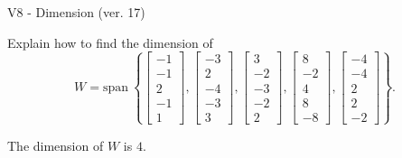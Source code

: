 \begin{exercise}
  \begin{exerciseTitle}V8 - Dimension (ver. 17)\end{exerciseTitle}
  \begin{exerciseStatement}
    Explain how to find the dimension of 
\[W=\mathrm{span}\ \left\{\left[\begin{array}{r}
-1 \\
-1 \\
2 \\
-1 \\
1
\end{array}\right] , \left[\begin{array}{r}
-3 \\
2 \\
-4 \\
-3 \\
3
\end{array}\right] , \left[\begin{array}{r}
3 \\
-2 \\
-3 \\
-2 \\
2
\end{array}\right] , \left[\begin{array}{r}
8 \\
-2 \\
4 \\
8 \\
-8
\end{array}\right] , \left[\begin{array}{r}
-4 \\
-4 \\
2 \\
2 \\
-2
\end{array}\right]\right\}.\]



  \end{exerciseStatement}
  \begin{exerciseAnswer}
   The dimension of \(W\) is  \(4\).
  


  \end{exerciseAnswer}
\end{exercise}